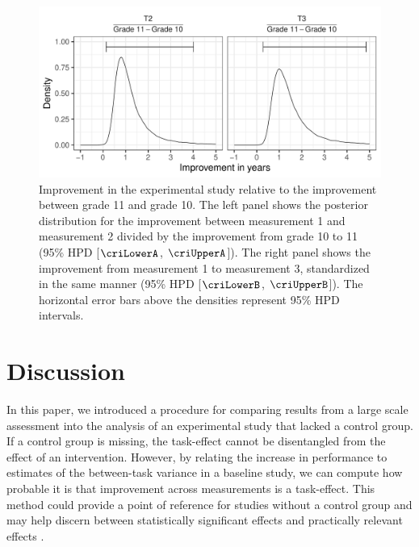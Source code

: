 \documentclass[a4paper]{article}
\newcommand{\setVal}[4]{%
	\pgfplotstablegetelem{#1}{#2}\of{#3}%
	\pgfmathprintnumberto{\pgfplotsretval}{#4}%
}
\newcommand{\DONa}	[1]		{\todo[inline, linecolor=gray, backgroundcolor=white]	{Don:	{#1}}}
\begin{document}
\tbCRIimprovement
\setVal{0}{lower}{\tbCRIimprovement}{\criLowerA}
\setVal{0}{upper}{\tbCRIimprovement}{\criUpperA}
\setVal{1}{lower}{\tbCRIimprovement}{\criLowerB}
\setVal{1}{upper}{\tbCRIimprovement}{\criUpperB}
\begin{figure}[!ht]
	\includegraphics[width=\textwidth]{figures/improvementInYears.pdf}
	\caption{Improvement in the experimental study relative to the improvement between grade 11 and grade 10. The left panel shows the posterior distribution for the improvement between measurement 1 and measurement 2 divided by the improvement from grade 10 to 11 (95\% HPD [$\criLowerA$, $\criUpperA$]). The right panel shows the improvement from measurement 1 to measurement 3, standardized in the same manner (95\% HPD [$\criLowerB$, $\criUpperB$]). The horizontal error bars above the densities represent 95\% HPD intervals.}
	\label{fig:improvementInYears}
\end{figure}

\section*{Discussion}
In this paper, we introduced a procedure for comparing results from a large scale assessment into the analysis of an experimental study that lacked a control group. 
If a control group is missing, the task-effect cannot be disentangled from the effect of an intervention. 
However, by relating the increase in performance to estimates of the between-task variance in a baseline study, we can compute how probable it is that improvement across measurements is a task-effect. 
This method could provide a point of reference for studies without a control group and may help discern between statistically significant effects and practically relevant effects
\cite{hojat2004visitor, fan2001statistical}.
\end{document}
